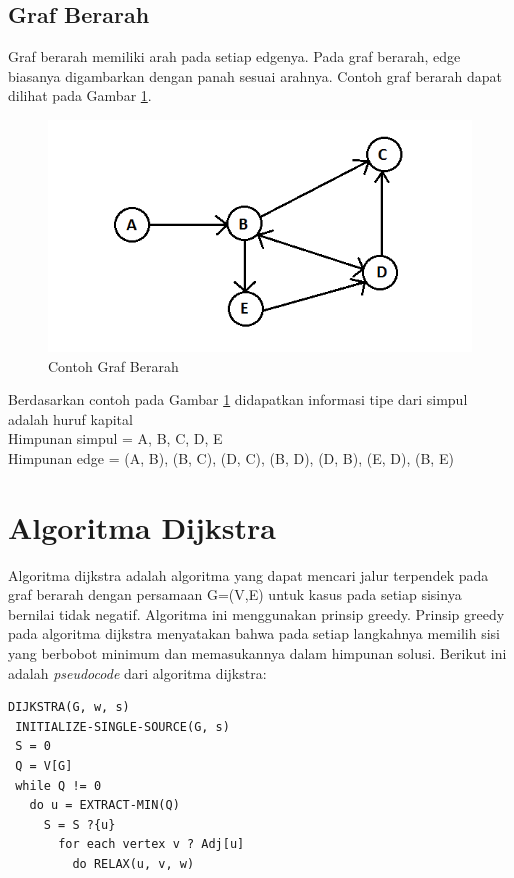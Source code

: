 \subsection{Graf Berarah}
Graf berarah memiliki arah pada setiap edgenya. Pada graf berarah, edge biasanya
digambarkan dengan panah sesuai arahnya. Contoh graf berarah dapat dilihat pada
Gambar \ref{fig:direc_graph}.
\begin{figure}[h]
\centering
\includegraphics[scale=1]{Gambar/direc_graph}
\caption[Contoh Graf Berarah]{Contoh Graf Berarah}
\label{fig:direc_graph}
\end{figure}

Berdasarkan contoh pada Gambar \ref{fig:direc_graph}  didapatkan informasi tipe
dari simpul adalah huruf kapital \\
Himpunan simpul = {A, B, C, D, E} \\ 
Himpunan edge = {(A, B), (B, C), (D, C), (B, D), (D, B), (E, D), (B, E)}

\section{Algoritma Dijkstra}
Algoritma dijkstra adalah algoritma yang dapat mencari jalur terpendek pada graf
berarah dengan persamaan G=(V,E) untuk kasus pada setiap sisinya bernilai tidak
negatif. Algoritma ini menggunakan prinsip greedy. Prinsip greedy pada algoritma dijkstra 
menyatakan bahwa pada setiap langkahnya memilih sisi yang berbobot minimum dan
memasukannya dalam himpunan solusi. Berikut ini adalah \textit{pseudocode} dari
algoritma dijkstra:
\begin{verbatim}
DIJKSTRA(G, w, s)
 INITIALIZE-SINGLE-SOURCE(G, s)
 S = 0
 Q = V[G]
 while Q != 0
   do u = EXTRACT-MIN(Q)
     S = S ?{u}
       for each vertex v ? Adj[u]
         do RELAX(u, v, w)
\end{verbatim}
